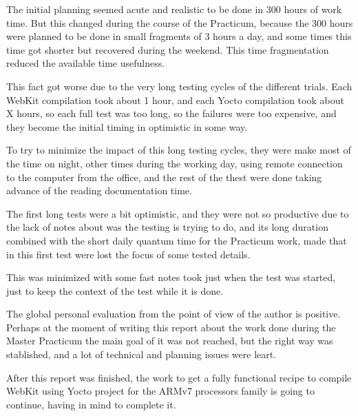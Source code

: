 \documentclass[a4paper,11pt,openany]{report}
\begin{document}
The initial planning seemed acute and realistic to be done in 300 hours of work time. But this changed during the course of the Practicum, because the 300 hours were planned to be done in small fragments of 3 hours a day, and some times this time got shorter but recovered during the weekend. This time fragmentation reduced the available time usefulness.

This fact got worse due to the very long testing cycles of the different trials. Each WebKit compilation took about 1 hour, and each Yocto compilation took about X hours, so each full test was too long, so the failures were too expensive, and they become the initial timing in optimistic in some way.

To try to minimize the impact of this long testing cycles, they were make most of the time on night, other times during the working day, using remote connection to the computer from the office, and the rest of the thest were done taking advance of the reading documentation time.

The first long tests were a bit optimistic, and they were not so productive due to the lack of notes about was the testing is trying to do, and its long duration combined with the short daily quantum time for the Practicum work, made that in this first test were lost the focus of some tested details.

This was minimized with some fast notes took just when the test was started, just to keep the context of the test while it is done.

The global personal evaluation from the point of view of the author is positive. Perhaps at the moment of writing this report about the work done during the Master Practicum the main goal of it was not reached, but the right way was stablished, and a lot of technical and planning issues were leart.

After this report was finished, the work to get a fully functional recipe to compile WebKit using Yocto project for the ARMv7 processors family is going to continue, having in mind to complete it.
\end{document}
